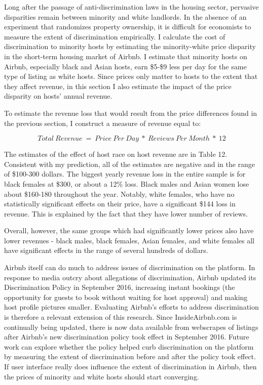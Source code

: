 
Long after the passage of anti-discrimination laws in the housing sector, pervasive disparities remain between minority and white landlords. In the absence of an experiment that randomizes property ownership, it is difficult for economists to measure the extent of discrimination empirically. I calculate the cost of discrimination to minority hosts by estimating the minority-white price disparity in the short-term housing market of Airbnb. I estimate that minority hosts on Airbnb, especially black and Asian hosts, earn \$5-\$9 less per day for the same type of listing as white hosts. Since prices only matter to hosts to the extent that they affect revenue, in this section I also estimate the impact of the price disparity on hosts' annual revenue.

To estimate the revenue loss that would result from the price differences found in the previous section, I construct a measure of revenue equal to: 

\[Total \: Revenue \ = \ Price \: Per \: Day \ * \ Reviews \: Per \: Month \ * \ 12\] 

The estimates of the effect of host race on host revenue are in Table 12. Consistent with my prediction, all of the estimates are negative and in the range of \$100-300 dollars. The biggest yearly revenue loss in the entire sample is for black females at \$300, or about a 12\% loss. Black males and Asian women lose about \$160-180 throughout the year. Notably, white females, who have no statistically significant effects on their price, have a significant \$144 loss in revenue. This is explained by the fact that they have lower number of reviews. 

Overall, however, the same groups which had significantly lower prices also have lower revenues - black males, black females, Asian females, and white females all have significant effects in the range of several hundreds of dollars. 

Airbnb itself can do much to address issues of discrimination on the platform. In response to media outcry about allegations of discrimination, Airbnb updated its Discrimination Policy in September 2016, increasing instant bookings (the opportunity for guests to book without waiting for host approval) and making host profile pictures smaller. Evaluating Airbnb's efforts to address discrimination is therefore a relevant extension of this research. Since InsideAirbnb.com is continually being updated, there is now data available from webscrapes of listings after Airbnb's new discrimination policy took effect in September 2016. Future work can explore whether the policy helped curb discrimination on the platform by measuring the extent of discrimination before and after the policy took effect. If user interface really does influence the extent of discrimination in Airbnb, then the prices of minority and white hosts should start converging. 

